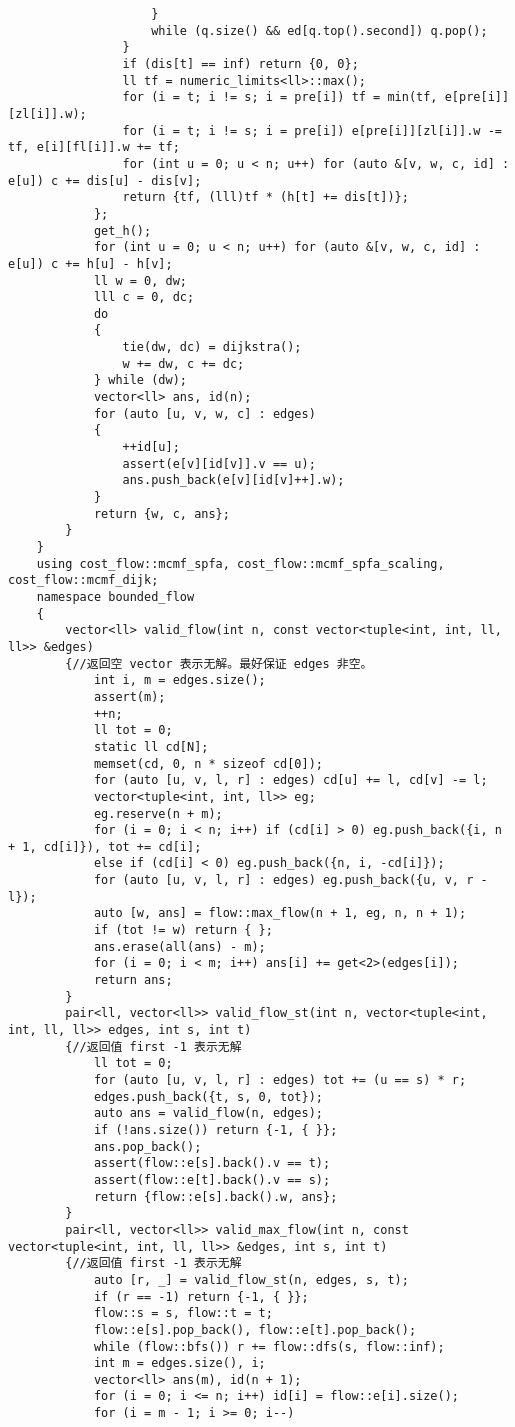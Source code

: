 \documentclass[12pt]{ctexart}
\begin{document}
\begin{lstlisting}
					}
					while (q.size() && ed[q.top().second]) q.pop();
				}
				if (dis[t] == inf) return {0, 0};
				ll tf = numeric_limits<ll>::max();
				for (i = t; i != s; i = pre[i]) tf = min(tf, e[pre[i]][zl[i]].w);
				for (i = t; i != s; i = pre[i]) e[pre[i]][zl[i]].w -= tf, e[i][fl[i]].w += tf;
				for (int u = 0; u < n; u++) for (auto &[v, w, c, id] : e[u]) c += dis[u] - dis[v];
				return {tf, (lll)tf * (h[t] += dis[t])};
			};
			get_h();
			for (int u = 0; u < n; u++) for (auto &[v, w, c, id] : e[u]) c += h[u] - h[v];
			ll w = 0, dw;
			lll c = 0, dc;
			do
			{
				tie(dw, dc) = dijkstra();
				w += dw, c += dc;
			} while (dw);
			vector<ll> ans, id(n);
			for (auto [u, v, w, c] : edges)
			{
				++id[u];
				assert(e[v][id[v]].v == u);
				ans.push_back(e[v][id[v]++].w);
			}
			return {w, c, ans};
		}
	}
	using cost_flow::mcmf_spfa, cost_flow::mcmf_spfa_scaling, cost_flow::mcmf_dijk;
	namespace bounded_flow
	{
		vector<ll> valid_flow(int n, const vector<tuple<int, int, ll, ll>> &edges)
		{//返回空 vector 表示无解。最好保证 edges 非空。
			int i, m = edges.size();
			assert(m);
			++n;
			ll tot = 0;
			static ll cd[N];
			memset(cd, 0, n * sizeof cd[0]);
			for (auto [u, v, l, r] : edges) cd[u] += l, cd[v] -= l;
			vector<tuple<int, int, ll>> eg;
			eg.reserve(n + m);
			for (i = 0; i < n; i++) if (cd[i] > 0) eg.push_back({i, n + 1, cd[i]}), tot += cd[i];
			else if (cd[i] < 0) eg.push_back({n, i, -cd[i]});
			for (auto [u, v, l, r] : edges) eg.push_back({u, v, r - l});
			auto [w, ans] = flow::max_flow(n + 1, eg, n, n + 1);
			if (tot != w) return { };
			ans.erase(all(ans) - m);
			for (i = 0; i < m; i++) ans[i] += get<2>(edges[i]);
			return ans;
		}
		pair<ll, vector<ll>> valid_flow_st(int n, vector<tuple<int, int, ll, ll>> edges, int s, int t)
		{//返回值 first -1 表示无解
			ll tot = 0;
			for (auto [u, v, l, r] : edges) tot += (u == s) * r;
			edges.push_back({t, s, 0, tot});
			auto ans = valid_flow(n, edges);
			if (!ans.size()) return {-1, { }};
			ans.pop_back();
			assert(flow::e[s].back().v == t);
			assert(flow::e[t].back().v == s);
			return {flow::e[s].back().w, ans};
		}
		pair<ll, vector<ll>> valid_max_flow(int n, const vector<tuple<int, int, ll, ll>> &edges, int s, int t)
		{//返回值 first -1 表示无解
			auto [r, _] = valid_flow_st(n, edges, s, t);
			if (r == -1) return {-1, { }};
			flow::s = s, flow::t = t;
			flow::e[s].pop_back(), flow::e[t].pop_back();
			while (flow::bfs()) r += flow::dfs(s, flow::inf);
			int m = edges.size(), i;
			vector<ll> ans(m), id(n + 1);
			for (i = 0; i <= n; i++) id[i] = flow::e[i].size();
			for (i = m - 1; i >= 0; i--)

\end{lstlisting}
\end{document}
